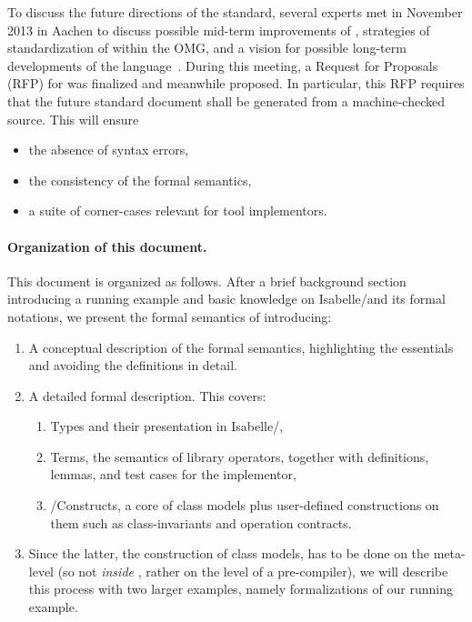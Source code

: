 To discuss the future directions of the standard, several \OCL experts met 
in November 2013 in Aachen to discuss possible mid-term improvements of \OCL, 
strategies of standardization of \OCL within the OMG, and a vision for possible
long-term developments of the
language~\cite{brucker.ea:summary-aachen:2013}. During this meeting, a
Request for Proposals (RFP) for  was finalized and meanwhile
proposed. In particular, this RFP requires that the future 
standard document shall be generated from a machine-checked
source. This will ensure
\begin{itemize}
\item the absence of syntax errors,
\item the consistency of the formal semantics,
\item a suite of corner-cases relevant for \OCL tool implementors.
\end{itemize}

\paragraph{Organization of this document.}
This document is organized as follows. After a brief background section
introducing a running example and basic knowledge on Isabelle/\HOL and its formal
notations, we present the formal semantics of  \FOCL introducing:
\begin{enumerate}
\item A conceptual description of the formal semantics, highlighting the essentials
      and avoiding the definitions in detail.
\item A detailed formal description. This covers:
\begin{enumerate}
\item \OCL Types and their presentation in Isabelle/\HOL,
\item \OCL Terms, \ie{} the semantics of library operators, 
        together with definitions, lemmas, and test cases for the implementor,
\item \UML/\OCL Constructs, \ie{} a core of \UML class models plus user-defined
        constructions on them such as class-invariants and operation contracts.
\end{enumerate}
\item Since the latter, \ie{} the construction of \UML class models, has to be done on the meta-level
(so not \emph{inside} \HOL, rather on the level of a pre-compiler), we will describe this process
with two larger examples, namely formalizations of our running example.
\end{enumerate}
       

